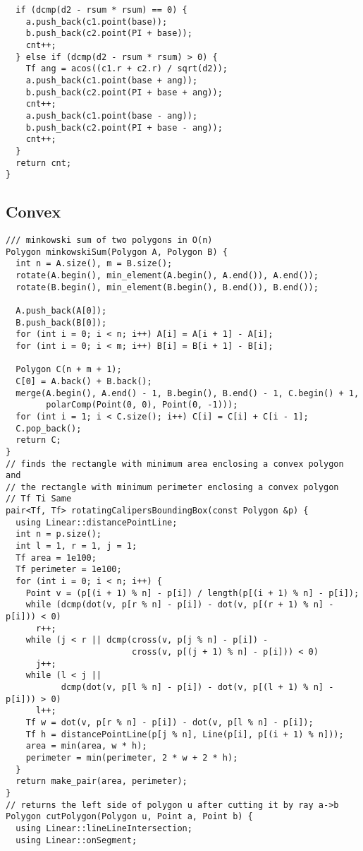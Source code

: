 \documentclass[FSZ,a4paper,onesided]{article}
\begin{document}
\begin{multicols*}{\COLS}
\begin{lstlisting}
  if (dcmp(d2 - rsum * rsum) == 0) {
    a.push_back(c1.point(base));
    b.push_back(c2.point(PI + base));
    cnt++;
  } else if (dcmp(d2 - rsum * rsum) > 0) {
    Tf ang = acos((c1.r + c2.r) / sqrt(d2));
    a.push_back(c1.point(base + ang));
    b.push_back(c2.point(PI + base + ang));
    cnt++;
    a.push_back(c1.point(base - ang));
    b.push_back(c2.point(PI + base - ang));
    cnt++;
  }
  return cnt;
}
\end{lstlisting}
\subsection{Convex}
\begin{lstlisting}
/// minkowski sum of two polygons in O(n)
Polygon minkowskiSum(Polygon A, Polygon B) {
  int n = A.size(), m = B.size();
  rotate(A.begin(), min_element(A.begin(), A.end()), A.end());
  rotate(B.begin(), min_element(B.begin(), B.end()), B.end());

  A.push_back(A[0]);
  B.push_back(B[0]);
  for (int i = 0; i < n; i++) A[i] = A[i + 1] - A[i];
  for (int i = 0; i < m; i++) B[i] = B[i + 1] - B[i];

  Polygon C(n + m + 1);
  C[0] = A.back() + B.back();
  merge(A.begin(), A.end() - 1, B.begin(), B.end() - 1, C.begin() + 1,
        polarComp(Point(0, 0), Point(0, -1)));
  for (int i = 1; i < C.size(); i++) C[i] = C[i] + C[i - 1];
  C.pop_back();
  return C;
}
// finds the rectangle with minimum area enclosing a convex polygon and
// the rectangle with minimum perimeter enclosing a convex polygon
// Tf Ti Same
pair<Tf, Tf> rotatingCalipersBoundingBox(const Polygon &p) {
  using Linear::distancePointLine;
  int n = p.size();
  int l = 1, r = 1, j = 1;
  Tf area = 1e100;
  Tf perimeter = 1e100;
  for (int i = 0; i < n; i++) {
    Point v = (p[(i + 1) % n] - p[i]) / length(p[(i + 1) % n] - p[i]);
    while (dcmp(dot(v, p[r % n] - p[i]) - dot(v, p[(r + 1) % n] - p[i])) < 0)
      r++;
    while (j < r || dcmp(cross(v, p[j % n] - p[i]) -
                         cross(v, p[(j + 1) % n] - p[i])) < 0)
      j++;
    while (l < j ||
           dcmp(dot(v, p[l % n] - p[i]) - dot(v, p[(l + 1) % n] - p[i])) > 0)
      l++;
    Tf w = dot(v, p[r % n] - p[i]) - dot(v, p[l % n] - p[i]);
    Tf h = distancePointLine(p[j % n], Line(p[i], p[(i + 1) % n]));
    area = min(area, w * h);
    perimeter = min(perimeter, 2 * w + 2 * h);
  }
  return make_pair(area, perimeter);
}
// returns the left side of polygon u after cutting it by ray a->b
Polygon cutPolygon(Polygon u, Point a, Point b) {
  using Linear::lineLineIntersection;
  using Linear::onSegment;


\end{lstlisting}
\end{multicols*}
\end{document}
